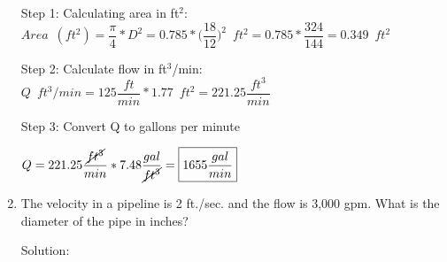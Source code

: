 \begin{enumerate}
\vspace{0.2cm}
Step 1:  Calculating area in ft${^2}$:\\
\vspace{0.2cm}
$Area \enspace (ft^2)= \dfrac{\pi}{4}*D^2= 0.785*\Big(\dfrac{18}{12}\Big)^2 \enspace ft^2=0.785*\dfrac{324}{144}=0.349 \enspace ft^2$\\
\vspace{0.2cm}

Step 2: Calculate flow in ft$^3$/min:\\

$ Q \enspace ft^3/min = 125 \dfrac{ft}{min}*1.77 \enspace ft^2 = 221.25 \dfrac{ft^3}{min}$\\

\vspace{0.2cm}

Step 3: Convert Q to gallons per minute

\vspace{0.2cm}

$Q=221.25 \dfrac{\cancel{ft^3}}{min}*7.48\dfrac{gal}{\cancel{ft^3}}=\boxed{1655 \dfrac{gal}{min}}$


\item The velocity in a pipeline is 2 ft./sec. and the flow is 3,000 gpm. What is the diameter of the pipe in inches?

Solution:\\
\vspace{0.2cm}


\end{enumerate}
